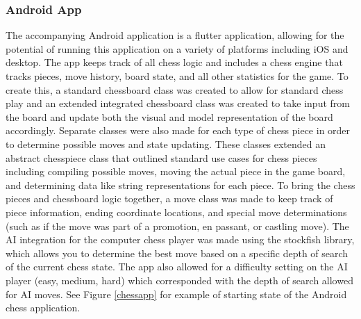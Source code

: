 \documentclass[11pt,journal]{IEEEtran}
\begin{document}
\subsubsection{Android App}
The accompanying Android application is a flutter application, allowing for the potential of running this application on a variety of platforms including iOS and desktop. The app keeps track of all chess logic and includes a chess engine that tracks pieces, move history, board state, and all other statistics for the game. To create this, a standard chessboard class was created to allow for standard chess play and an extended integrated chessboard class was created to take input from the board and update both the visual and model representation of the board accordingly. Separate classes were also made for each type of chess piece in order to determine possible moves and state updating. These classes extended an abstract chesspiece class that outlined standard use cases for chess pieces including compiling possible moves, moving the actual piece in the game board, and determining data like string representations for each piece. To bring the chess pieces and chessboard logic together, a move class was made to keep track of piece information, ending coordinate locations, and special move determinations (such as if the move was part of a promotion, en passant, or castling move). The AI integration for the computer chess player was made using the stockfish library, which allows you to determine the best move based on a specific depth of search of the current chess state. \cite{stockfish} The app also allowed for a difficulty setting on the AI player (easy, medium, hard) which corresponded with the depth of search allowed for AI moves. See Figure \ref{chessapp} for example of starting state of the Android chess application.
\end{document}
